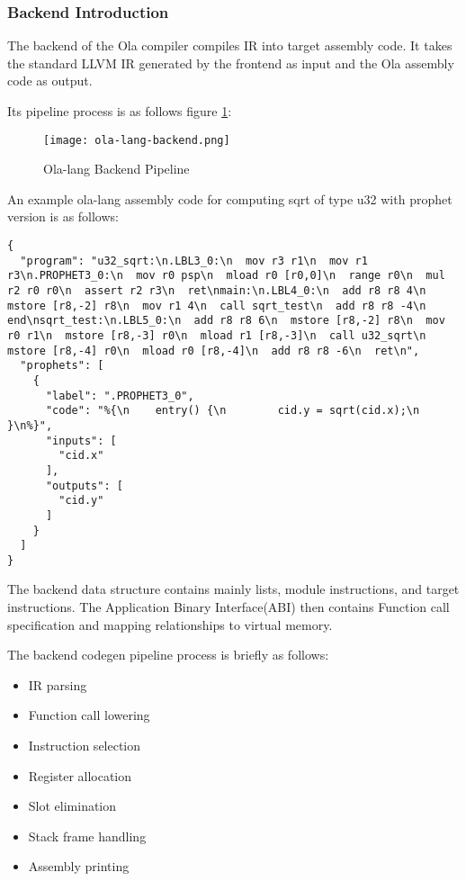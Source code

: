 \subsubsection{Backend Introduction}

The backend of the Ola compiler compiles IR into target assembly code. It takes the standard LLVM IR generated by the frontend as input and the Ola assembly code as output.

Its pipeline process is as follows figure \ref{fig:ola-lang-backend}:
\begin{figure}[!htbp]
    \centering
    \texttt{[image: ola-lang-backend.png]}
    \caption{Ola-lang Backend Pipeline}
    \label{fig:ola-lang-backend}
\end{figure}

An example ola-lang assembly code for computing sqrt of type u32 with prophet version is as follows:
\begin{lstlisting}[language={}]
{
  "program": "u32_sqrt:\n.LBL3_0:\n  mov r3 r1\n  mov r1 r3\n.PROPHET3_0:\n  mov r0 psp\n  mload r0 [r0,0]\n  range r0\n  mul r2 r0 r0\n  assert r2 r3\n  ret\nmain:\n.LBL4_0:\n  add r8 r8 4\n  mstore [r8,-2] r8\n  mov r1 4\n  call sqrt_test\n  add r8 r8 -4\n  end\nsqrt_test:\n.LBL5_0:\n  add r8 r8 6\n  mstore [r8,-2] r8\n  mov r0 r1\n  mstore [r8,-3] r0\n  mload r1 [r8,-3]\n  call u32_sqrt\n  mstore [r8,-4] r0\n  mload r0 [r8,-4]\n  add r8 r8 -6\n  ret\n",
  "prophets": [
    {
      "label": ".PROPHET3_0",
      "code": "%{\n    entry() {\n        cid.y = sqrt(cid.x);\n    }\n%}",
      "inputs": [
        "cid.x"
      ],
      "outputs": [
        "cid.y"
      ]
    }
  ]
}
\end{lstlisting}


The backend data structure contains mainly lists, module instructions, and target instructions.
The Application Binary Interface(ABI) then contains Function call specification and mapping relationships to virtual memory.

The backend codegen pipeline process is briefly as follows:
\begin{itemize}
    \item IR parsing

    \item Function call lowering

    \item Instruction selection

    \item Register allocation

    \item Slot elimination

    \item Stack frame handling

    \item Assembly printing
\end{itemize}
